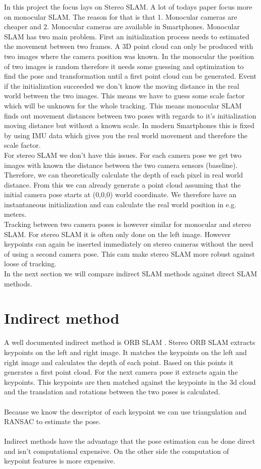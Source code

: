 \documentclass[11pt,a4paper,titlepage,oneside]{report}
\begin{document}
In this project the focus lays on Stereo SLAM. A lot of todays paper focus more on monocular SLAM. The reason for that is that 1. Monocular cameras are cheaper and 2. Monocular cameras are available in Smartphones. Monocular SLAM has two main problem. First an initialization process needs to estimated the movement between two frames. A 3D point cloud can only be produced with two images where the camera position was known. In the monocular the position of two images is random therefore it needs some guessing and optimization to find the pose and transformation until a first point cloud can be generated. Event if the initialization succeeded we don't know the moving distance in the real world between the two images. This means we have to guess some scale factor which will be unknown for the whole tracking. This means monocular SLAM finds out movement distances between two poses with regards to it's initialization moving distance but without a known scale. In modern Smartphones this is fixed by using IMU data which gives you the real world movement and therefore the scale factor.\\
For stereo SLAM we don't have this issues. For each camera pose we get two images with known the distance between the two camera sensors (baseline). Therefore, we can theoretically calculate the depth of each pixel in real world distance. From this we can already generate a point cloud assuming that the initial camera pose starts at (0,0,0) world coordinate. We therefore have an instantaneous initialization and can calculate the real world position in e.g. meters.\\
Tracking between two camera poses is however similar for monocular and stereo SLAM. For stereo SLAM it is often only done on the left image. However keypoints can again be inserted immediately on stereo cameras without the need of using a second camera pose. This cam make stereo SLAM more robust against loose of tracking.\\
In the next section we will compare indirect SLAM methods against direct SLAM methods.

\section{Indirect method}

A well documented indirect method is ORB SLAM \cite{orbslam}. Stereo ORB SLAM extracts keypoints on the left and right image. It matches the keypoints on the left and right image and calculates the depth of each point. Based on this points it generates a first point cloud. For the next camera pose it extracts again the keypoints. This keypoints are then matched against the keypoints in the 3d cloud and the translation and rotations between the two poses is calculated.\\\\
Because we know the descriptor of each keypoint we can use triangulation and RANSAC to estimate the pose.\\\\
Indirect methods have the advantage that the pose estimation can be done direct and isn't computational expensive. On the other side the computation of keypoint features is more expensive.
\end{document}
